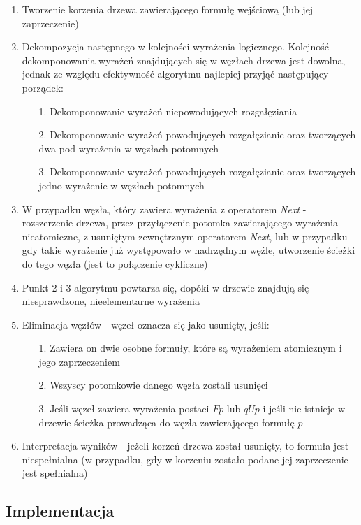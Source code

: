 \documentclass[12pt,a4paper,titlepage]{article}
\begin{document}
\begin{enumerate}
	\item Tworzenie korzenia drzewa zawierającego formułę wejściową (lub jej zaprzeczenie)
	\item Dekompozycja następnego w kolejności wyrażenia logicznego. Kolejność dekomponowania wyrażeń znajdujących się w węzłach drzewa jest dowolna, jednak ze względu efektywność algorytmu najlepiej przyjąć następujący porządek:
	\begin{itemize}
	\item[1.] Dekomponowanie wyrażeń niepowodujących rozgałęziania
	\item[2.] Dekomponowanie wyrażeń powodujących rozgałęzianie oraz tworzących dwa pod-wyrażenia w węzłach potomnych
	\item[3.] Dekomponowanie wyrażeń powodujących rozgałęzianie oraz tworzących jedno wyrażenie w węzłach potomnych
	\end{itemize}
	\item W przypadku węzła, który zawiera wyrażenia z operatorem \textit{Next} - rozszerzenie drzewa, przez przyłączenie potomka zawierającego wyrażenia nieatomiczne, z usuniętym zewnętrznym operatorem \textit{Next}, lub w przypadku gdy takie wyrażenie już występowało w nadrzędnym węźle, utworzenie ścieżki do tego węzła (jest to połączenie cykliczne)
	\item Punkt 2 i 3 algorytmu powtarza się, dopóki w drzewie znajdują się niesprawdzone, nieelementarne wyrażenia
	\item Eliminacja węzłów - węzeł oznacza się jako usunięty, jeśli:
	\begin{itemize}
	\item[1.] Zawiera on dwie osobne formuły, które są wyrażeniem atomicznym i jego zaprzeczeniem
	\item[2.] Wszyscy potomkowie danego węzła zostali usunięci
	\item[3.] Jeśli węzeł zawiera wyrażenia postaci $F p$ lub $q U p$ i jeśli nie istnieje w drzewie ścieżka prowadząca do węzła zawierającego formułę $p$ 
	\end{itemize}
	\item Interpretacja wyników - jeżeli korzeń drzewa został usunięty, to formuła jest niespełnialna (w przypadku, gdy w korzeniu zostało podane jej zaprzeczenie jest spełnialna)
\end{enumerate}

\subsection{Implementacja}
\label{Implementacja}
\end{document}
